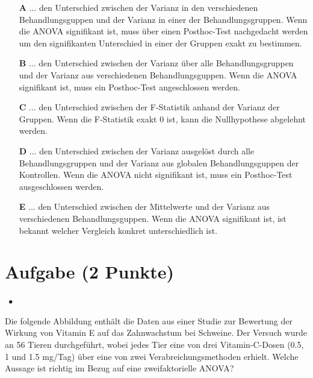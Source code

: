 \documentclass[a4paper, 9pt]{scrartcl}\usepackage[]{graphicx}\usepackage[]{xcolor}
\begin{document}
\begin{enumerate}
\item [\textbf{A} \msquare] ... den Unterschied zwischen der Varianz in den verschiedenen Behandlungsguppen und der Varianz in einer der Behandlungsgruppen. Wenn die ANOVA signifikant ist, muss über einen Posthoc-Test nachgedacht werden um den signifikanten Unterschied in einer der Gruppen exakt zu bestimmen.
\item [\textbf{B} \msquare] ... den Unterschied zwischen der Varianz über alle Behandlungsgruppen und der Varianz aus verschiedenen Behandlungsguppen. Wenn die ANOVA signifikant ist, muss ein Posthoc-Test angeschlossen werden.
\item [\textbf{C} \msquare] ... den Unterschied zwischen der F-Statistik anhand der Varianz der Gruppen. Wenn die F-Statistik exakt 0 ist, kann die Nullhypothese abgelehnt werden.
\item [\textbf{D} \msquare] ... den Unterschied zwischen der Varianz ausgelöst durch alle Behandlungsgruppen und der Varianz aus globalen Behandlungsguppen der Kontrollen. Wenn die ANOVA nicht signifikant ist, muss ein Posthoc-Test ausgeschlossen werden.
\item [\textbf{E} \msquare] ... den Unterschied zwischen der Mittelwerte und der Varianz aus verschiedenen Behandlungsguppen. Wenn die ANOVA signifikant ist, ist bekannt welcher Vergleich konkret unterschiedlich ist.
\end{enumerate}

\section{Aufgabe \hfill (2 Punkte)}

\ifcollection
\begin{flushright}
\tiny\vspace{-2Ex}
\textbf{\examinhaltstart}
\exammodulestatversuch $\;\bullet$
\exammodulebiostat
\vspace{-1Ex}
\end{flushright}
\fi




Die folgende Abbildung enthält die Daten aus einer Studie zur Bewertung der Wirkung von Vitamin E auf das Zahnwachstum bei Schweine. Der Versuch wurde an 56 Tieren durchgeführt, wobei jedes Tier eine von  drei Vitamin-C-Dosen (0.5, 1 und 1.5 mg/Tag) über eine von zwei Verabreichungsmethoden erhielt. Welche Aussage ist richtig im Bezug auf eine zweifaktorielle ANOVA?
\end{document}
